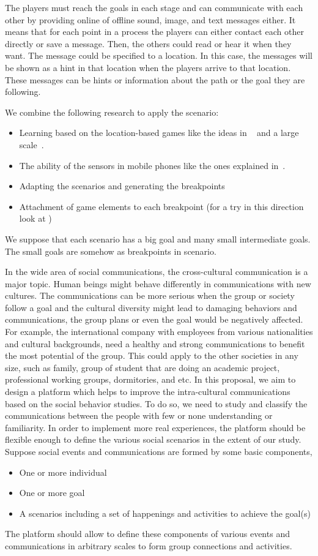 \documentclass[conference]{IEEEtran}
\begin{document}
 The players must reach the goals in each stage and can communicate with each other by providing online of offline sound, image, and text messages either. It means that for each point in a process the players can either contact each other directly or save a message. Then, the others could read or hear it when they want. The message could be specified to a location. In this case, the messages will be shown as a hint in that location when the players arrive to that location. These messages can be hints or information about the path or the goal they are following.

We combine the following research to apply the scenario:
\begin{itemize}
\item Learning based on the location-based games like the ideas in ~\cite{rexplorer} and 
a large scale~\cite{scal-loc-g}.
\item The ability of the sensors in mobile phones like the ones explained in~\cite{sensors}.
\item Adapting the scenarios and generating the breakpoints
\item Attachment of game elements to each breakpoint (for a try in this direction 
look at \cite{totem})
\end{itemize}

We suppose that each scenario has a big goal and many small intermediate goals.
The small goals are somehow as breakpoints in scenario. 


In the wide area of social communications, the cross-cultural communication is 
a major topic. Human beings might behave differently in communications with
new cultures. The communications can be more serious when the group or society 
follow a goal and the cultural diversity might lead to damaging behaviors and communications,
the group plans or even the goal would be negatively affected.
For example, the international company with employees from various nationalities
and cultural backgrounds, need a healthy and strong communications to benefit the most potential
of the group. This could apply to the other societies in any size, such as family, group of student that
are doing an academic project, professional working groups, dormitories, and etc. 
In this proposal, we aim to design a platform which helps to improve the intra-cultural communications based on the social behavior studies. To do so, we need to study and classify the 
communications between the people with few or none understanding or familiarity. In order to implement 
more real experiences, the platform should be flexible enough to define the various social scenarios in the extent of our study.
Suppose social events and communications are formed by some basic components,
\begin{itemize}
\item One or more individual
\item One or more goal
\item A scenarios including a set of happenings and activities to achieve the goal(s)
\end{itemize}
The platform should allow to define these components of various events and communications in 
arbitrary scales to form group connections and activities. 
\end{document}
